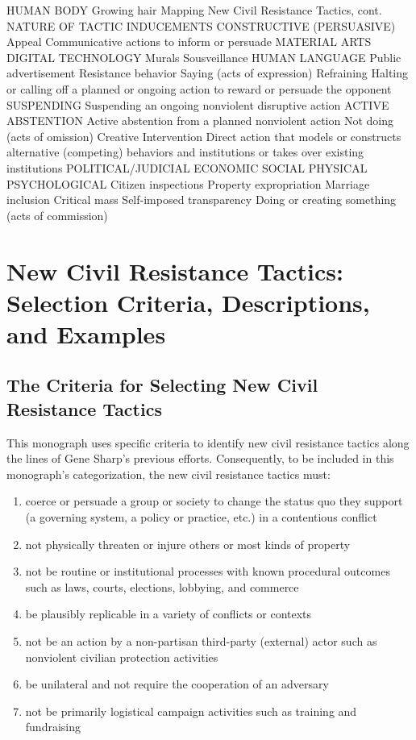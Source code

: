 \documentclass[twoside,a4paper,12pt,fleqn,openany]{extbook}
\begin{document}
HUMAN BODY
Growing hair
Mapping New Civil Resistance Tactics, cont.
NATURE OF TACTIC INDUCEMENTS
CONSTRUCTIVE (PERSUASIVE)
Appeal
Communicative actions to inform or persuade
MATERIAL ARTS
DIGITAL TECHNOLOGY
Murals
Sousveillance
HUMAN LANGUAGE
Public advertisement
Resistance behavior
Saying (acts of expression)
Refraining
Halting or calling off a planned or ongoing action to reward or persuade the opponent
SUSPENDING
Suspending an ongoing nonviolent disruptive action
ACTIVE ABSTENTION
Active abstention from a planned nonviolent action
Not doing
(acts of omission)
Creative Intervention
Direct action that models or constructs alternative (competing) behaviors and institutions or takes over existing institutions
POLITICAL/JUDICIAL
ECONOMIC
SOCIAL
PHYSICAL
PSYCHOLOGICAL
Citizen inspections
Property expropriation
Marriage inclusion
Critical mass
Self-imposed transparency
Doing or creating something
(acts of commission)

\chapter{New Civil Resistance Tactics: Selection Criteria, Descriptions, and Examples}

\section*{The Criteria for Selecting New Civil Resistance Tactics}

This monograph uses specific criteria to identify new civil resistance tactics along the lines of Gene Sharp’s previous efforts. Consequently, to be included in this monograph’s categorization, the new civil resistance tactics must:

\begin{enumerate}
\item coerce or persuade a group or society to change the status quo they support (a governing system, a policy or practice, etc.) in a contentious conflict
\item not physically threaten or injure others or most kinds of property
\item not be routine or institutional processes with known procedural outcomes such as laws, courts, elections, lobbying, and commerce
\item be plausibly replicable in a variety of conflicts or contexts
\item not be an action by a non-partisan third-party (external) actor such as nonviolent civilian protection activities
\item be unilateral and not require the cooperation of an adversary
\item not be primarily logistical campaign activities such as training and fundraising
\end{enumerate}
\end{document}
